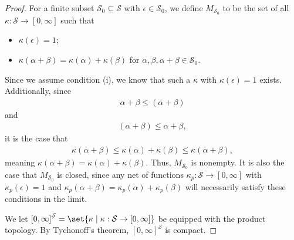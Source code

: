 \begin{proof}
  For a finite subset $\mathcal{S}_0 \subseteq \mathcal{S}$ with $\epsilon\in \mathcal{S}_0$, we define $M_{\mathcal{S}_0}$ to be the set of all $\kappa: \mathcal{S}\rightarrow [0,\infty]$ such that
  \begin{itemize}
    \item $\kappa\left(\epsilon\right) = 1$;
    \item $\kappa\left(\alpha + \beta\right) = \kappa\left(\alpha\right) + \kappa\left(\beta\right)$ for $\alpha,\beta,\alpha + \beta\in \mathcal{S}_0$.
  \end{itemize}
  Since we assume condition (i), we know that such a $\kappa$ with $\kappa\left(\epsilon\right) = 1$ exists. Additionally, since
  \begin{align*}
    \alpha + \beta \leq \left(\alpha + \beta\right)
  \end{align*}
  and
  \begin{align*}
    \left(\alpha + \beta\right) \leq \alpha + \beta,
  \end{align*}
  it is the case that
  \begin{align*}
    \kappa\left(\alpha + \beta\right) \leq \kappa\left(\alpha\right) + \kappa\left(\beta\right) \leq \kappa\left(\alpha + \beta\right),
  \end{align*}
  meaning $\kappa\left(\alpha + \beta\right) = \kappa\left(\alpha\right) + \kappa\left(\beta\right)$. Thus, $M_{\mathcal{S}_0}$ is nonempty. It is also the case that $M_{\mathcal{S}_0}$ is closed, since any net of functions $\kappa_{p}: \mathcal{S}\rightarrow [0,\infty]$ with $\kappa_{p}\left(\epsilon\right) = 1$ and $\kappa_{p}\left(\alpha + \beta\right) = \kappa_{p}\left(\alpha\right) + \kappa_{p}\left(\beta\right)$ will necessarily satisfy these conditions in the limit.\newline

  We let $\left[0,\infty\right]^{\mathcal{S}} = \set{\kappa\mid \kappa:\mathcal{S}\rightarrow [0,\infty]}$ be equipped with the product topology. By Tychonoff's theorem, $\left[0,\infty\right]^{\mathcal{S}}$ is compact.\newline


\end{proof}

